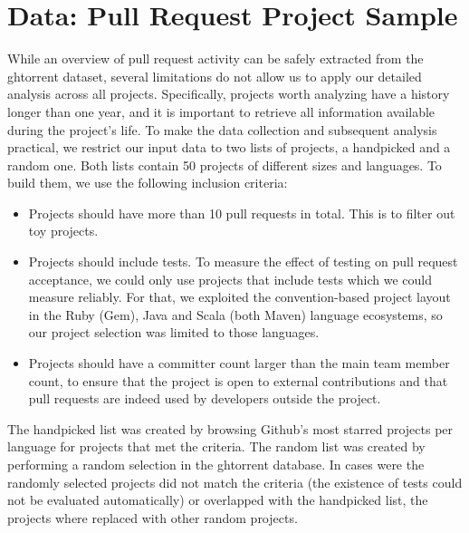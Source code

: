 \documentclass{acm_proc_article-sp}
\begin{document}


\section{Data: Pull Request Project Sample}
\label{sec:expdata} 

While an overview of pull request activity can be safely extracted from the {\sc
ght}orrent dataset, several limitations do not allow us to apply our detailed
analysis across all projects. Specifically, projects worth analyzing have a
history longer than one year, and it is important to retrieve all information
available during the project's life. To make the data collection and subsequent
analysis practical, we restrict our input data to two lists of projects, a
\textsf{handpicked} and a \textsf{random} one. Both lists contain 50 projects
of different sizes and languages. To build them, we use the following
inclusion criteria:

\begin{itemize}

  \item Projects should have more than 10 pull requests in total. This is
    to filter out toy projects. 

  \item Projects should include tests. To measure the effect of testing on pull
    request acceptance, we could only use projects that include tests which we
    could measure reliably. For that, we exploited the convention-based project
    layout in the Ruby (Gem), Java and Scala (both Maven) language ecosystems,
    so our project selection was limited to those languages. 

  \item Projects should have a committer count larger than the main team member
    count, to ensure that the project is open to external contributions and that
    pull requests are indeed used by developers outside the project.

\end{itemize}

The \textsf{handpicked} list was created by browsing Github's most starred projects
per language for projects that met the criteria. The \textsf{random} list
was created by performing a random selection in the {\sc ght}orrent database. In
cases were the randomly selected projects did not match the criteria (the existence
of tests could not be evaluated automatically) or overlapped with the
\textsf{handpicked} list, the projects where replaced with
other random projects. 
\end{document}
